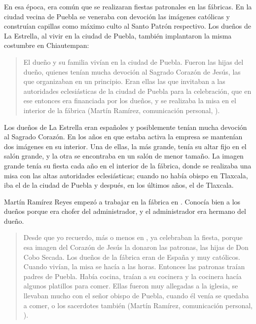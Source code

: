 \documentclass[14pt,letterpaper,twoside]{extbook} %
\begin{document}
\noindent En esa época, era común que se realizaran fiestas patronales en las fábricas. En la ciudad vecina de Puebla se veneraba con devoción las imágenes católicas y construían capillas como máximo culto al Santo Patrón respectivo. Los dueños de La Estrella, al vivir en la ciudad de Puebla, también implantaron la misma costumbre en Chiautempan:

\begin{quotation}
\noindent El dueño y su familia vivían en la ciudad de Puebla. Fueron las hijas del dueño, quienes tenían mucha devoción al Sagrado Corazón de Jesús, las que organizaban en un principio. Eran ellas las que invitaban a las autoridades eclesiásticas de la ciudad de Puebla para la celebración, que en ese entonces era financiada por los dueños, y se realizaba la misa en el interior de la fábrica (Martín Ramírez, comunicación personal, ).
\end{quotation}

\noindent Los dueños de La Estrella eran españoles y posiblemente tenían mucha devoción al Sagrado Corazón. En los años en que estaba activa la empresa se mantenían dos imágenes en su interior. Una de ellas, la más grande, tenía su altar fijo en el salón grande, y la otra se encontraba en un salón de menor tamaño. La imagen grande tenía su fiesta cada año en el interior de la fábrica, donde se realizaba una misa con las altas autoridades eclesiásticas; cuando no había obispo en Tlaxcala, iba el de la ciudad de Puebla y después, en los últimos años, el de Tlaxcala.

Martín Ramírez Reyes empezó a trabajar en la fábrica en . Conocía bien a los dueños porque era chofer del administrador, y el administrador era hermano del dueño.

\begin{quotation}
\noindent Desde que yo recuerdo, más o menos en , ya celebraban la fiesta, porque esa imagen del Corazón de Jesús la donaron las patronas, las hijas de Don Cobo Secada. Los dueños de la fábrica eran de España y muy católicos. Cuando vivían, la misa se hacía a las  horas. Entonces las patronas traían padres de Puebla. Había cocina, traían a su cocinera y la cocinera hacía algunos platillos para comer. Ellas fueron muy allegadas a la iglesia, se llevaban mucho con el señor obispo de Puebla, cuando él venía se quedaba a comer, o los sacerdotes también (Martín Ramírez, comunicación personal, ).
\end{quotation}
\end{document}
